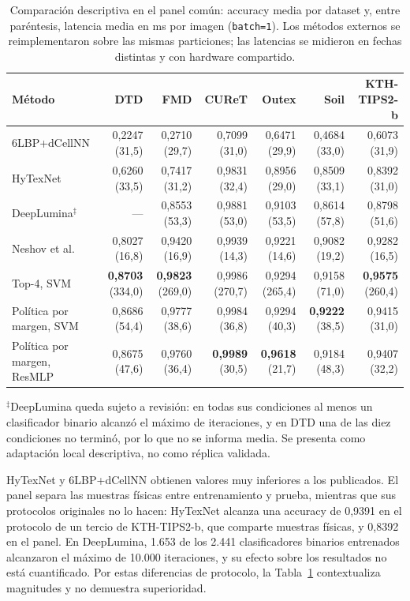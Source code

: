 \documentclass[a4paper,fleqn]{cas-sc}
\begin{document}
\begin{table}[pos=htbp]
\centering
\caption{Comparación descriptiva en el panel común: accuracy media por dataset y, entre paréntesis, latencia media en ms por imagen (\texttt{batch=1}). Los métodos externos se reimplementaron sobre las mismas particiones; las latencias se midieron en fechas distintas y con hardware compartido.}
\label{tab:sota}
\footnotesize
\setlength{\tabcolsep}{3.5pt}
\begin{tabular}{@{}lrrrrrr@{}}
\toprule
Método & DTD & FMD & CUReT & Outex & Soil & KTH-TIPS2-b \\
\midrule
6LBP+dCellNN \citep{chang2024cellnn} & 0,2247 (31,5) & 0,2710 (29,7) & 0,7099 (31,0) & 0,6471 (29,9) & 0,4684 (33,0) & 0,6073 (31,9) \\
HyTexNet \citep{gupta2026hytexnet} & 0,6260 (33,5) & 0,7417 (31,2) & 0,9831 (32,4) & 0,8956 (29,0) & 0,8509 (33,1) & 0,8392 (31,0) \\
DeepLumina$^{\ddagger}$ \citep{simon2022deeplumina} & --- & 0,8553 (53,3) & 0,9881 (53,0) & 0,9103 (53,5) & 0,8614 (57,8) & 0,8798 (51,6) \\
Neshov et al. \citep{neshov2025aggregation} & 0,8027 (16,8) & 0,9420 (16,9) & 0,9939 (14,3) & 0,9221 (14,6) & 0,9082 (19,2) & 0,9282 (16,5) \\
\midrule
Top-4, SVM & \textbf{0,8703} (334,0) & \textbf{0,9823} (269,0) & 0,9986 (270,7) & 0,9294 (265,4) & 0,9158 (71,0) & \textbf{0,9575} (260,4) \\
Política por margen, SVM & 0,8686 (54,4) & 0,9777 (38,6) & 0,9984 (36,8) & 0,9294 (40,3) & \textbf{0,9222} (38,5) & 0,9415 (31,0) \\
Política por margen, ResMLP & 0,8675 (47,6) & 0,9760 (36,4) & \textbf{0,9989} (30,5) & \textbf{0,9618} (21,7) & 0,9184 (48,3) & 0,9407 (32,2) \\
\bottomrule
\end{tabular}

\vspace{0.35em}
\begin{minipage}{0.98\textwidth}\footnotesize
$^{\ddagger}$DeepLumina queda sujeto a revisión: en todas sus condiciones al menos un clasificador binario alcanzó el máximo de iteraciones, y en DTD una de las diez condiciones no terminó, por lo que no se informa media. Se presenta como adaptación local descriptiva, no como réplica validada.
\end{minipage}
\end{table}

HyTexNet y 6LBP+dCellNN obtienen valores muy inferiores a los publicados. El panel separa las muestras físicas entre entrenamiento y prueba, mientras que sus protocolos originales no lo hacen: HyTexNet alcanza una accuracy de 0,9391 en el protocolo de un tercio de KTH-TIPS2-b, que comparte muestras físicas, y 0,8392 en el panel. En DeepLumina, 1.653 de los 2.441 clasificadores binarios entrenados alcanzaron el máximo de 10.000 iteraciones, y su efecto sobre los resultados no está cuantificado. Por estas diferencias de protocolo, la Tabla~\ref{tab:sota} contextualiza magnitudes y no demuestra superioridad.
\FloatBarrier
\end{document}
